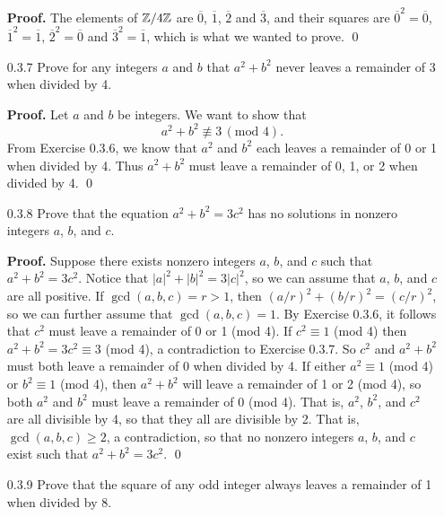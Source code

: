 \begin{enumerate}
      \textbf{Proof.} The elements of $\mathbb{Z}/4\mathbb{Z}$ are $\overline{0}$,
      $\overline{1}$, $\overline{2}$ and $\overline{3}$, and their squares are
      $\overline{0}^2 = \overline{0}$, $\overline{1}^2 = \overline{1}$,
      $\overline{2}^2 = \overline{0}$ and $\overline{3}^2 = \overline{1}$, which
      is what we wanted to prove. \qed
   \item[0.3.7]   Prove for any integers $a$ and $b$ that $a^2 + b^2$ never
                  leaves a remainder of 3 when divided by 4.
                  
      \textbf{Proof.} Let $a$ and $b$ be integers. We want to show that
      $$a^2 + b^2 \not\equiv 3 \,(\text{mod }4).$$
      From Exercise 0.3.6, we know that $a^2$ and $b^2$ each leaves a remainder
      of 0 or 1 when divided by 4. Thus $a^2 + b^2$ must leave a remainder of
      0, 1, or 2 when divided by 4. \qed
   \item[0.3.8]   Prove that the equation $a^2 + b^2 = 3c^2$ has no solutions in
                  nonzero integers $a$, $b$, and $c$.
                  
      \textbf{Proof.} Suppose there exists nonzero integers $a$, $b$, and $c$
      such that $a^2 + b^2 = 3c^2$. Notice that $|a|^2 + |b|^2 = 3|c|^2$, so we
      can assume that $a$, $b$, and $c$ are all positive. If
      $\gcd(a, b, c) = r > 1$, then $(a/r)^2 + (b/r)^2 = (c/r)^2$, so we can
      further assume that $\gcd(a, b, c) = 1$. By Exercise 0.3.6, it follows
      that $c^2$ must leave a remainder of 0 or 1 (mod 4). If $c^2 \equiv 1$
      (mod 4) then $a^2 + b^2 = 3c^2 \equiv 3$ (mod 4), a contradiction to
      Exercise 0.3.7. So $c^2$ and $a^2 + b^2$ must both leave a remainder of
      0 when divided by 4. If either $a^2 \equiv 1$ (mod 4) or $b^2 \equiv 1$
      (mod 4), then $a^2 + b^2$ will leave a remainder of 1 or 2 (mod 4), so
      both $a^2$ and $b^2$ must leave a remainder of 0 (mod 4). That is,
      $a^2$, $b^2$, and $c^2$ are all divisible by 4, so that they all are
      divisible by 2. That is, $\gcd(a, b, c) \ge 2$, a contradiction, so that
      no nonzero integers $a$, $b$, and $c$ exist such that
      $a^2 + b^2 = 3c^2$. \qed
   \item[0.3.9]   Prove that the square of any odd integer always leaves a
                  remainder of 1 when divided by 8.
                  

\end{enumerate}
